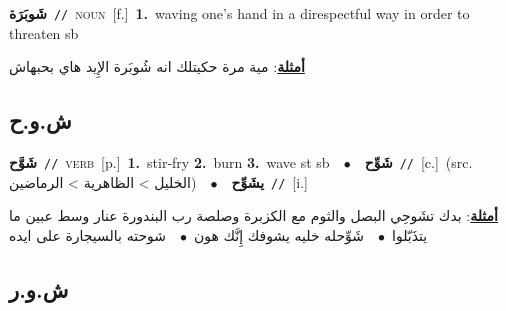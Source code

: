 \documentclass[10pt,a4paper,twoside]{article} %
\begin{document}
\begin{multicols}{2}
{\setlength\topsep{0pt}\textbf{\foreignlanguage{arabic}{شَوبَرَة}}\ {\color{gray}\texttt{//}\color{black}}\ \textsc{noun}\ [f.]\ \textbf{1.}~waving one's hand in a direspectful way in order to threaten sb\  \begin{flushright}\color{gray}\foreignlanguage{arabic}{\textbf{\underline{\foreignlanguage{arabic}{أمثلة}}}: مية مرة حكيتلك انه شُوبَرة الإِيد هاي بحبهاش}\end{flushright}\color{black}} \vspace{2mm}

\vspace{-3mm}
\subsection*{\color{blue}\foreignlanguage{arabic}{ش.و.ح}\color{blue}{}} 

{\setlength\topsep{0pt}\textbf{\foreignlanguage{arabic}{شَوَّح}}\ {\color{gray}\texttt{//}\color{black}}\ \textsc{verb}\ [p.]\ \textbf{1.}~stir-fry  \textbf{2.}~burn  \textbf{3.}~wave st sb\ \ $\bullet$\ \ \setlength\topsep{0pt}\textbf{\foreignlanguage{arabic}{شَوِّح}}\ {\color{gray}\texttt{//}\color{black}}\ [c.]\ (src. \color{gray}\foreignlanguage{arabic}{الخليل > الظاهرية > الرماضين}\color{black})\ \ $\bullet$\ \ \setlength\topsep{0pt}\textbf{\foreignlanguage{arabic}{يشَوِّح}}\ {\color{gray}\texttt{//}\color{black}}\ [i.]\  \begin{flushright}\color{gray}\foreignlanguage{arabic}{\textbf{\underline{\foreignlanguage{arabic}{أمثلة}}}: بدك تشَوحِي البصل والثوم مع الكزبرة وصلصة رب البندورة عنار وسط عبين ما يتذَبّلوا\ $\bullet$\ \  شَوِّحله خليه يشوفك إِنَّك هون\ $\bullet$\ \  شوحته بالسيجارة على ايده}\end{flushright}\color{black}} \vspace{2mm}

\vspace{-3mm}
\subsection*{\color{blue}\foreignlanguage{arabic}{ش.و.ر}\color{blue}{}} 


\end{multicols}
\end{document}
